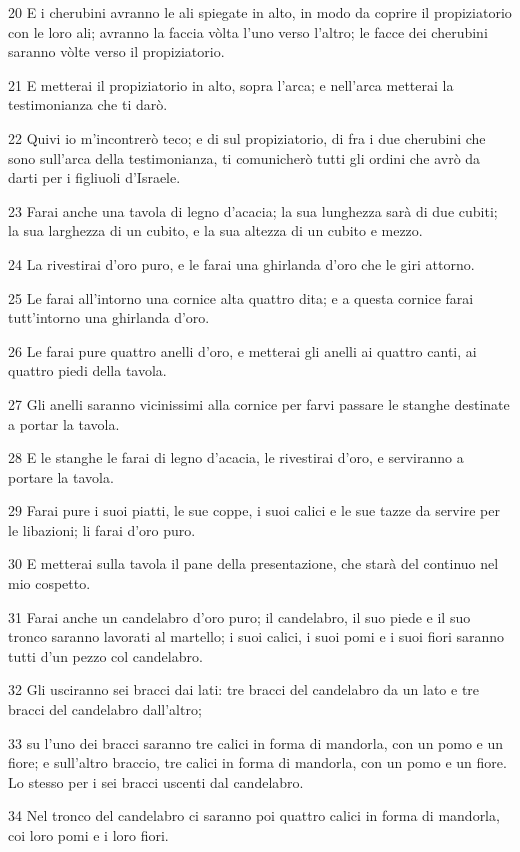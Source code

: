 \par 20 E i cherubini avranno le ali spiegate in alto, in modo da coprire il propiziatorio con le loro ali; avranno la faccia vòlta l'uno verso l'altro; le facce dei cherubini saranno vòlte verso il propiziatorio.
\par 21 E metterai il propiziatorio in alto, sopra l'arca; e nell'arca metterai la testimonianza che ti darò.
\par 22 Quivi io m'incontrerò teco; e di sul propiziatorio, di fra i due cherubini che sono sull'arca della testimonianza, ti comunicherò tutti gli ordini che avrò da darti per i figliuoli d'Israele.
\par 23 Farai anche una tavola di legno d'acacia; la sua lunghezza sarà di due cubiti; la sua larghezza di un cubito, e la sua altezza di un cubito e mezzo.
\par 24 La rivestirai d'oro puro, e le farai una ghirlanda d'oro che le giri attorno.
\par 25 Le farai all'intorno una cornice alta quattro dita; e a questa cornice farai tutt'intorno una ghirlanda d'oro.
\par 26 Le farai pure quattro anelli d'oro, e metterai gli anelli ai quattro canti, ai quattro piedi della tavola.
\par 27 Gli anelli saranno vicinissimi alla cornice per farvi passare le stanghe destinate a portar la tavola.
\par 28 E le stanghe le farai di legno d'acacia, le rivestirai d'oro, e serviranno a portare la tavola.
\par 29 Farai pure i suoi piatti, le sue coppe, i suoi calici e le sue tazze da servire per le libazioni; li farai d'oro puro.
\par 30 E metterai sulla tavola il pane della presentazione, che starà del continuo nel mio cospetto.
\par 31 Farai anche un candelabro d'oro puro; il candelabro, il suo piede e il suo tronco saranno lavorati al martello; i suoi calici, i suoi pomi e i suoi fiori saranno tutti d'un pezzo col candelabro.
\par 32 Gli usciranno sei bracci dai lati: tre bracci del candelabro da un lato e tre bracci del candelabro dall'altro;
\par 33 su l'uno dei bracci saranno tre calici in forma di mandorla, con un pomo e un fiore; e sull'altro braccio, tre calici in forma di mandorla, con un pomo e un fiore. Lo stesso per i sei bracci uscenti dal candelabro.
\par 34 Nel tronco del candelabro ci saranno poi quattro calici in forma di mandorla, coi loro pomi e i loro fiori.
